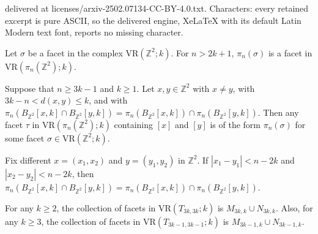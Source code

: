 \documentclass[10pt,a4paper]{amsart}
\newcommand{\Z}{\ensuremath{\mathbb{Z}}}
\newcommand{\vr}[2]{\mathrm{VR}(#1;#2)}
\begin{document}
delivered at licenses/arxiv-2502.07134-CC-BY-4.0.txt. Characters: every retained excerpt is pure ASCII, so the delivered engine, XeLaTeX with its default Latin Modern text font, reports no missing character.
\begin{lemma}
\label{lemma:imageoffacets}
Let $\sigma$ be a facet in the complex $\vr{\Z^2}{k}$.
For $n>2k+1$, $\pi_n(\sigma)$ is a facet in $\vr{\pi_n(\Z^2)}{k}$.
\end{lemma}

\begin{lemma}
\label{lemma:prefacets}
Suppose that $n\geq 3k-1$ and $k\geq 1$.
Let $x,y\in\Z^2$ with $x\neq y$, with $3k-n< d(x,y)\leq k$, and with $\pi_n(B_{\Z^2}[x, k]\cap B_{\Z^2}[y, k]) =\pi_n(B_{\Z^2}[x, k])\cap \pi_n(B_{\Z^2}[y, k])$.
Then any facet $\tau$ in $\vr{\pi_n(\Z^2)}{k}$ containing $[x]$ and $[y]$ is of the form $\pi_n(\sigma)$ for some facet $\sigma\in \vr{\Z^2}{k}$.
\end{lemma}

\begin{lemma}
\label{lemma:emptyintersection} 
Fix different $x=(x_1,x_2)$ and $y=(y_1,y_2)$ in $\Z^2$.
If $|x_1-y_1|<n-2k$ and $|x_2-y_2|<n-2k$, then $\pi_n (B_{\Z^2}[x,k]\cap B_{\Z^2}[y,k]) =\pi_n(B_{\Z^2}[x,k]) \cap \pi_n(B_{\Z^2}[y,k])$.
\end{lemma}

\begin{lemma}
\label{lem:facets_3kor3k-1}
For any $k\geq 2$, the collection of facets in $\vr{T_{3k,3k}}{k}$ is $M_{3k,k}\cup N_{3k,k}$.
Also, for any $k\geq 3$, the collection of facets in $\vr{T_{3k-1,3k-1}}{k}$ is $M_{3k-1,k}\cup N_{3k-1,k}$.
\end{lemma}
\end{document}
